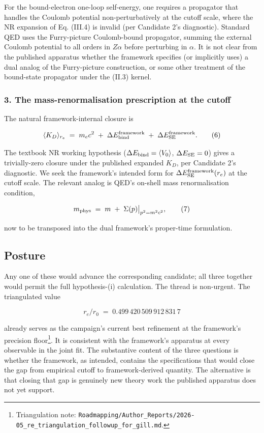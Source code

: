 \documentclass[
  11pt,
]{article}
\begin{document}
For the bound-electron one-loop self-energy, one requires a propagator
that handles the Coulomb potential non-perturbatively at the cutoff
scale, where the NR expansion of Eq. (III.4) is invalid (per Candidate
2's diagnostic). Standard QED uses the Furry-picture Coulomb-bound
propagator, summing the external Coulomb potential to all orders in
\(Z\alpha\) before perturbing in \(\alpha\). It is not clear from the
published apparatus whether the framework specifies (or implicitly uses)
a dual analog of the Furry-picture construction, or some other treatment
of the bound-state propagator under the (II.3) kernel.

\hypertarget{the-mass-renormalisation-prescription-at-the-cutoff}{%
\subsubsection{3. The mass-renormalisation prescription at the
cutoff}\label{the-mass-renormalisation-prescription-at-the-cutoff}}

The natural framework-internal closure is

\[
\langle K_D \rangle_{r_e}
\;=\; m_e c^2 \;+\; \Delta E_{\rm bind}^{\rm framework} \;+\; \Delta E_{\rm SE}^{\rm framework}.
\tag{6}
\]

The textbook NR working hypothesis
(\(\Delta E_{\rm bind} = \langle V_0\rangle\),
\(\Delta E_{\rm SE} = 0\)) gives a trivially-zero closure under the
published expanded \(K_D\), per Candidate 2's diagnostic. We seek the
framework's intended form for \(\Delta E_{\rm SE}^{\rm framework}(r_e)\)
at the cutoff scale. The relevant analog is QED's on-shell mass
renormalisation condition,

\[
m_{\rm phys} \;=\; m \;+\; \Sigma(p)\big|_{p^2 = m^2 c^2},
\tag{7}
\]

now to be transposed into the dual framework's proper-time formulation.

\hypertarget{posture}{%
\subsection{Posture}\label{posture}}

Any one of these would advance the corresponding candidate; all three
together would permit the full hypothesis-(i) calculation. The thread is
non-urgent. The triangulated value

\[
r_e/r_0 \;=\; 0.499\,420\,509\,912\,831\,7
\tag{8}
\]

already serves as the campaign's current best refinement at the
framework's precision floor\footnote{Triangulation note:
  \texttt{Roadmapping/Author\_Reports/2026-05\_re\_triangulation\_followup\_for\_gill.md}.}.
It is consistent with the framework's apparatus at every observable in
the joint fit. The substantive content of the three questions is whether
the framework, as intended, contains the specifications that would close
the gap from empirical cutoff to framework-derived quantity. The
alternative is that closing that gap is genuinely new theory work the
published apparatus does not yet support.
\end{document}
